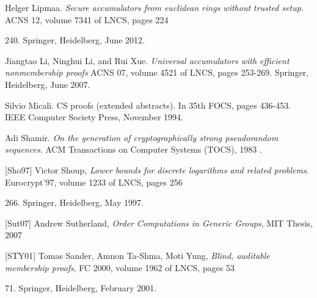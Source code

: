 \documentclass[11pt, lettersize, notitlepage, leqno, footskip=0.6cm]{article}
\newcommand{\noin}{\noindent}
\numberwithin{equation}{section}
\begin{document}


\noin [Lip12] Helger Lipmaa. \textit{Secure accumulators from euclidean rings without trusted setup.} ACNS 12, volume 7341 of LNCS, pages 224{240. Springer, Heidelberg, June 2012.\vspace{0.1cm}

\noin [LLX07] Jiangtao Li, Ninghui Li, and Rui Xue.  \textit{Universal accumulators with efficient nonmembership proofs} ACNS 07, volume 4521 of LNCS, pages 253-269. Springer, Heidelberg, June 2007.\vspace{0.1cm}


\noin [Mic94] Silvio Micali. CS proofs (extended abstracts). In 35th FOCS, pages 436-453. IEEE Computer Society Press, November 1994.\vspace{0.1cm}


\noin [Sha83] Adi Shamir. \textit{On the generation of cryptographically strong pseudorandom
sequences}. ACM Transactions on Computer Systems (TOCS), 1983 \vspace{0.1cm}.

\noin \hypertarget{Sho97}{[Sho97]} Victor Shoup, \textit{Lower bounds for discrete logarithms and related problems}. Eurocrypt'97, volume 1233 of LNCS, pages 256{266. Springer, Heidelberg, May 1997. \vspace{0.1cm}

\noin \hypertarget{Sut07}{[Sut07]} Andrew Sutherland, \textit{Order Computations in Generic Groups}, MIT Thesis, 2007 \vspace{0.1cm}

\noin \hypertarget{STY01}{[STY01]} Tomas Sander, Amnon Ta-Shma, Moti Yung, \textit{Blind, auditable membership proofs}, FC 2000, volume 1962 of LNCS, pages 53{71. Springer, Heidelberg, February 2001.\vspace{0.1cm}

}}}
\end{document}
